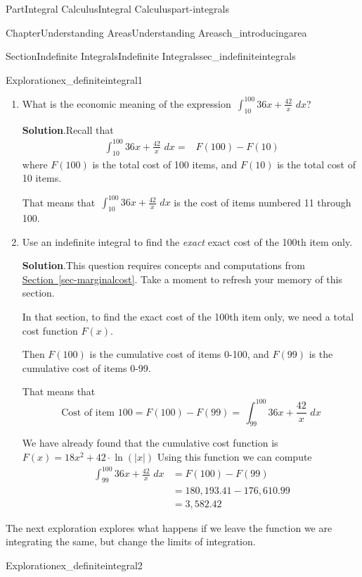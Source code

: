 \documentclass[oneside,10pt,]{tufte-book}
\newcommand{\blocktitlefont}{\relax}
\newcommand{\xreffont}{\relax}
\numberwithin{equation}{chapter}
\newcommand{\intdx}[1]{{\,\int#1\,\,dx}}
\newcommand{\amp}{&}
\begin{document}
\begin{partptx}{Part}{Integral Calculus}{}{Integral Calculus}{}{}{part-integrals}
\begin{chapterptx}{Chapter}{Understanding Areas}{}{Understanding Areas}{}{}{ch_introducingarea}
\begin{sectionptx}{Section}{Indefinite Integrals}{}{Indefinite Integrals}{}{}{sec_indefiniteintegrals}
\begin{exploration}{Exploration}{}{ex_definiteintegral1}
\begin{enumerate}[font=\bfseries,label=(\alph*),ref=\alph*]
%
\item{}What is the economic meaning of the expression \(\displaystyle\intdx{_{10}^{100} 36x + \frac{42}{x}}\)?%
\par\smallskip%
\noindent\textbf{\blocktitlefont Solution}.\hypertarget{ex_definiteintegral1-3-2}{}\quad{}Recall that%
\begin{align*}
\intdx{_{10}^{100} 36x + \frac{42}{x}}  = \amp F(100) - F(10) 
\end{align*}
where \(F(100)\) is the total cost of 100 items, and \(F(10)\) is the total cost of 10 items.%
\par
That means that \(\intdx{_{10}^{100} 36x + \frac{42}{x}}\) is the cost of items numbered 11 through 100.%
\item{}Use an indefinite integral to find the \emph{exact} exact cost of the 100th item only.%
\par\smallskip%
\noindent\textbf{\blocktitlefont Solution}.\hypertarget{ex_definiteintegral1-4-2}{}\quad{}This question requires concepts and computations from  \hyperref[sec-marginalcost]{Section~{\xreffont\ref{sec-marginalcost}}}. Take a moment to refresh your memory of this section.%
\par
In that section, to find the exact cost of the 100th item only, we need a total cost function \(F(x)\).%
\par
Then \(F(100)\) is the cumulative cost of items 0-100, and \(F(99)\) is the cumulative cost of items 0-99.%
\par
That means that%
\begin{equation*}
\text{Cost of item }100 = F(100) - F(99) = \intdx{_{99}^{100}  36x + \frac{42}{x} }
\end{equation*}
%
\par
We have already found that the cumulative cost function is \(F(x)  = 18x^2 + 42\cdot \ln(|x|)\) Using this function we can compute%
\begin{align*}
\intdx{_{99}^{100}  36x + \frac{42}{x} } \amp = F(100) - F(99)\\
\amp =180,193.41 - 176,610.99\\
\amp = 3,582.42 
\end{align*}
%
\end{enumerate}%
\end{exploration}%
The next exploration explores what happens if we leave the function we are integrating the same, but change the limits of integration.%
\begin{exploration}{Exploration}{}{ex_definiteintegral2}%
\begin{enumerate}[font=\bfseries,label=(\alph*),ref=\alph*]%

\end{enumerate}
\end{exploration}
\end{sectionptx}
\end{chapterptx}
\end{partptx}
\end{document}
